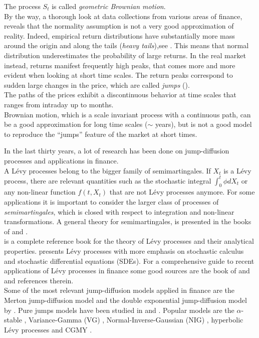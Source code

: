 The process $S_t$ is called \emph{geometric Brownian motion}.\\
By the way, a thorough look at data collections from various areas of finance, reveals that the normality assumption 
is not a very good approximation of reality.
Indeed, empirical return distributions have substantially 
more mass around the origin and along the tails (\emph{heavy tails}),see \cite{Cont01}.
This means that normal distribution underestimates the probability of large returns. 
In the real market instead, returns manifest frequently high peaks, that comes more and more evident when 
looking at short time scales.
The return peaks correspond to sudden large changes in the price, which are called \emph{jumps} (\cite{Cont}).\\
The paths of the prices exhibit a discontinuous behavior at time scales that ranges from intraday up to months.\\ 
Brownian motion, which is a scale invariant process with a continuous path, can be a good approximation for long 
time scales ($\sim$ years), but is not a good model to reproduce 
the ``jumps'' feature of the market at short times.

In the last thirty years, a lot of research has been done on jump-diffusion processes and applications in finance.\\
A Lévy processes belong to the bigger family of semimartingales.
If $X_t$ is a Lévy process, there are relevant quantities such as the stochastic integral $\int_0^t \phi dX_t$ or any non-linear function
$f(t,X_t)$ that are not Lévy processes anymore. For some applications it is important to consider the larger class of processes of \emph{semimartingales}, which is closed
with respect to integration and non-linear transformations.
A general theory for semimartingales, is presented in the books 
of \cite{Protter} and \cite{JacodShi}.\\
\cite{Sato} is a complete reference book for the theory of Lévy
processes and their analytical properties. 
\cite{Applebaum} presents Lévy processes with more emphasis on stochastic calculus and stochastic differential equations (SDEs).
For a comprehensive guide to recent applications of Lévy processes in finance some good sources are the book of 
\cite{Cont} and \cite{Schoutens} and references therein.\\
Some of the most relevant jump-diffusion models applied in finance are the Merton jump-diffusion model \cite{Me76} and the
double exponential jump-diffusion model by \cite{Kou02}.
Pure jumps models have been studied in \cite{GeMaYo01} and \cite{GeMaYo98}. Popular models
are the $\alpha$-stable \cite{Ma63} \cite{BoPoCo97} \cite{alpha09},		
Variance-Gamma (VG) \cite{MaSe90} \cite{MCC98}, 
Normal-Inverse-Gaussian (NIG) \cite{BN98}, hyperbolic Lévy processes \cite{EbKe95} and CGMY \cite{CGMY02}.

